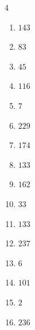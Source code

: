 \begin{multicols}{4}
\begin{enumerate}
  \item $143$


  \item $83$


  \item $45$


  \item $116$


  \item $7$


  \item $229$


  \item $174$


  \item $133$


  \item $162$


  \item $33$


  \item $133$


  \item $237$


  \item $6$


  \item $101$


\columnbreak %

  \item $2$


  \item $236$


\end{enumerate}
\end{multicols}
